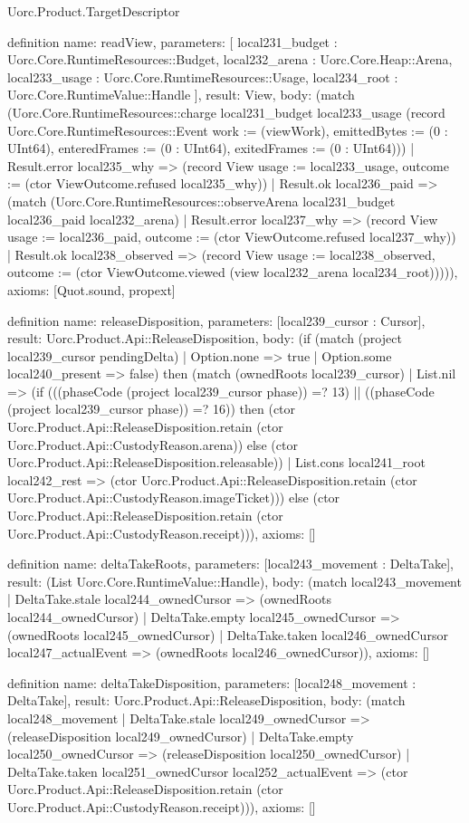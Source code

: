 \begin{lexlean}{Uorc.Product.TargetDescriptor}
\begin{semanticmodule}
definition{
  name: readView,
  parameters: [
    local231_budget : Uorc.Core.RuntimeResources::Budget,
    local232_arena : Uorc.Core.Heap::Arena,
    local233_usage : Uorc.Core.RuntimeResources::Usage,
    local234_root : Uorc.Core.RuntimeValue::Handle
  ],
  result: View,
  body: (match (Uorc.Core.RuntimeResources::charge local231_budget local233_usage (record Uorc.Core.RuntimeResources::Event {work := (viewWork), emittedBytes := (0 : UInt64), enteredFrames := (0 : UInt64), exitedFrames := (0 : UInt64)}))
    | Result.error local235_why => (record View {usage := local233_usage, outcome := (ctor ViewOutcome.refused local235_why)})
    | Result.ok local236_paid => (match (Uorc.Core.RuntimeResources::observeArena local231_budget local236_paid local232_arena)
      | Result.error local237_why => (record View {usage := local236_paid, outcome := (ctor ViewOutcome.refused local237_why)})
      | Result.ok local238_observed => (record View {usage := local238_observed, outcome := (ctor ViewOutcome.viewed (view local232_arena local234_root))}))),
  axioms: [Quot.sound, propext]
}

definition{
  name: releaseDisposition,
  parameters: [local239_cursor : Cursor],
  result: Uorc.Product.Api::ReleaseDisposition,
  body: (if (match (project local239_cursor pendingDelta)
    | Option.none => true
    | Option.some local240_present => false) then (match (ownedRoots local239_cursor)
    | List.nil => (if (((phaseCode (project local239_cursor phase)) =? 13) || ((phaseCode (project local239_cursor phase)) =? 16)) then (ctor Uorc.Product.Api::ReleaseDisposition.retain (ctor Uorc.Product.Api::CustodyReason.arena)) else (ctor Uorc.Product.Api::ReleaseDisposition.releasable))
    | List.cons local241_root local242_rest => (ctor Uorc.Product.Api::ReleaseDisposition.retain (ctor Uorc.Product.Api::CustodyReason.imageTicket))) else (ctor Uorc.Product.Api::ReleaseDisposition.retain (ctor Uorc.Product.Api::CustodyReason.receipt))),
  axioms: []
}

definition{
  name: deltaTakeRoots,
  parameters: [local243_movement : DeltaTake],
  result: (List Uorc.Core.RuntimeValue::Handle),
  body: (match local243_movement
    | DeltaTake.stale local244_ownedCursor => (ownedRoots local244_ownedCursor)
    | DeltaTake.empty local245_ownedCursor => (ownedRoots local245_ownedCursor)
    | DeltaTake.taken local246_ownedCursor local247_actualEvent => (ownedRoots local246_ownedCursor)),
  axioms: []
}

definition{
  name: deltaTakeDisposition,
  parameters: [local248_movement : DeltaTake],
  result: Uorc.Product.Api::ReleaseDisposition,
  body: (match local248_movement
    | DeltaTake.stale local249_ownedCursor => (releaseDisposition local249_ownedCursor)
    | DeltaTake.empty local250_ownedCursor => (releaseDisposition local250_ownedCursor)
    | DeltaTake.taken local251_ownedCursor local252_actualEvent => (ctor Uorc.Product.Api::ReleaseDisposition.retain (ctor Uorc.Product.Api::CustodyReason.receipt))),
  axioms: []
}


\end{semanticmodule}
\end{lexlean}
